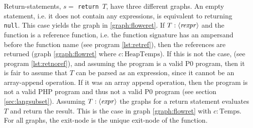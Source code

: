 \begin{graph}
{\begin{adjustbox}{max size={.25\textwidth}{.25\textheight}}
\end{adjustbox}}\hfill%
\hspace*{\fill}
\end{graph}

Return-statements, $s =$ \texttt{return $T$}, have three different graphs. An empty statement, i.e. it does not contain any expressions, is equivalent to returning \texttt{null}. This case yields the graph in \ref{graph:floweret}. If $T : \langle\mathit{rexpr}\rangle$ and the function is a reference function, i.e. the function signature has an ampersand before the function name (see program \ref{lst:retref}), then the references are returned (graph \ref{graph:flowret} where $c : \text{HeapTemps}$). If this is not the case, (see program \ref{lst:retnoref}), and assuming the program is a valid P0 program, then it is fair to assume that $T$ can be parsed as an expression, since it cannot be an array-append operation. If it was an array append operation, then the program is not a valid PHP program and thus not a valid P0 program (see section \ref{sec:langsubset}). Assuming $T : \langle\mathit{expr}\rangle$ the graphs for a return statement evaluates $T$ and return the result. This is the case in graph \ref{graph:flowret} with $c : \text{Temps}$.  For all graphs, the exit-node is the unique exit-node of the function.

